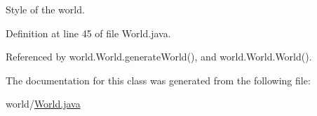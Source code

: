 Style of the world. 



Definition at line 45 of file World.\-java.



Referenced by world.\-World.\-generate\-World(), and world.\-World.\-World().



The documentation for this class was generated from the following file\-:\begin{DoxyCompactItemize}
\item 
world/\hyperlink{_world_8java}{World.\-java}\end{DoxyCompactItemize}
